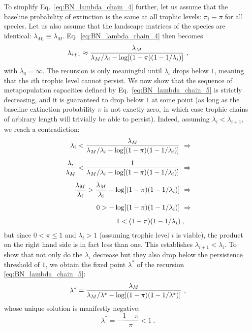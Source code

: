 \documentclass[11pt]{article}
\let\originalleft\left
\let\originalright\right
\renewcommand{\left}{\mathopen{}\mathclose\bgroup\originalleft}
\renewcommand{\right}{\aftergroup\egroup\originalright}
\begin{document}
To simplify Eq.~\ref{eq:BN_lambda_chain_4} further, let us assume that the baseline probability of extinction is the same at all trophic levels: $\pi_i \equiv \pi$ for all species. Let us also assume that the landscape matrices of the species are identical: $\lambda_{M_i} \equiv \lambda_M$. Eq.~\ref{eq:BN_lambda_chain_4} then becomes
\begin{equation}
  \label{eq:BN_lambda_chain_5}
  \lambda_{i+1} \approx \frac{\lambda_M}{\lambda_M / \lambda_i -\log \left[ (1 -
      \pi) (1-1/\lambda_i) \right]} \ ,
\end{equation}
with $\lambda_0 = \infty$. The recursion is only meaningful until $\lambda_i$ drops below $1$, meaning that the $i$th trophic level cannot persist. We now show that the sequence of metapopulation capacities defined by Eq.~\ref{eq:BN_lambda_chain_5} is strictly decreasing, and it is guaranteed to drop below $1$ at some point (as long as the baseline extinction probability $\pi$ is not exactly zero, in which case trophic chains of arbirary length will trivially be able to persist). Indeed, assuming $\lambda_i < \lambda_{i+1}$, we reach a contradiction:
\begin{equation}
  \label{eq:BN_lambda_chain_6}
  \begin{split}
    \lambda_i < \frac{\lambda_M}{\lambda_M / \lambda_i -
      \log \left[ (1 - \pi) (1-1/\lambda_i) \right]} \ \Rightarrow \\[0.5em]
    \frac{\lambda_i}{\lambda_M} < \frac{1}{\lambda_M / \lambda_i -
      \log \left[ (1 - \pi) (1-1/\lambda_i) \right]} \ \Rightarrow \\[0.5em]
    \frac{\lambda_M}{\lambda_i} > \frac{\lambda_M}{\lambda_i} -
    \log \left[ (1 - \pi) (1-1/\lambda_i) \right] \ \Rightarrow \\[0.5em]
    0 > -\log \left[ (1 - \pi) (1-1/\lambda_i) \right]
    \ \Rightarrow \\[0.5em]
    1 < (1 - \pi) (1-1/\lambda_i) \: , \quad
  \end{split}
\end{equation}
but since $0 < \pi \le 1$ and $\lambda_i > 1$ (assuming trophic level $i$ is viable), the product on the right hand side is in fact less than one. This establishes $\lambda_{i+1} < \lambda_i$. To show that not only do the $\lambda_i$ decrease but they also drop below the persistence threshold of $1$, we obtain the fixed point $\lambda^*$ of the recursion \ref{eq:BN_lambda_chain_5}:
\begin{equation}
  \label{eq:BN_lambda_chain_7}
  \lambda^* = \frac{\lambda_M}{\lambda_M / \lambda^* -
    \log \left[ (1 - \pi) (1-1/\lambda^*) \right]} \ ,
\end{equation}
whose unique solution is manifestly negative:
\begin{equation}
  \label{eq:BN_lambda_chain_8}
  \lambda^* = - \frac{1 - \pi}{\pi} < 1 \ .
\end{equation}
\end{document}

